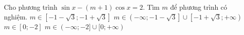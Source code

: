 \begin{ex}%
Cho phương trình $\sin x - (m+1)\cos x =2$. Tìm $m$ để phương trình có nghiệm.
\choice
{$m\in \left[-1-\sqrt{3}; -1 + \sqrt{3}\right]$}
{\True $m\in \left(-\infty;-1-\sqrt{3}\right]\cup \left[-1 + \sqrt{3};+\infty\right)$}
{$m\in [0;-2]$}
{$m\in (-\infty;-2]\cup [0;+\infty)$}
\loigiai{
Điều kiện có nghiệm
$$1+(m+1)^2-4\geq 0\Leftrightarrow m^2+2m-2\geq 0 \Leftrightarrow m\in \left(-\infty;-1-\sqrt{3}\right]\cup \left[-1 + \sqrt{3};+\infty\right).$$	
}
\end{ex}